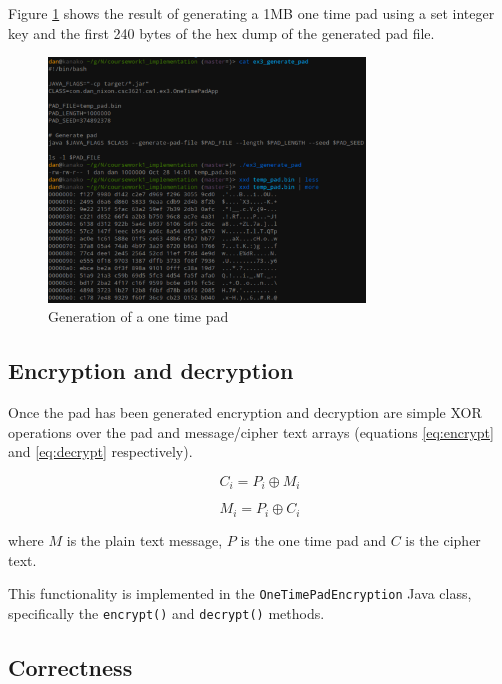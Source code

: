 \documentclass[a4paper]{article}
\begin{document}
Figure \ref{fig:generate_pad} shows the result of generating a 1MB one time pad
using a set integer key and the first 240 bytes of the hex dump of the generated
pad file.

\begin{figure}[h!]
  \centering
  \includegraphics[width=0.75\textwidth]{graphics/ex3_pad_generation.eps}
  \caption{Generation of a one time pad}
  \label{fig:generate_pad}
\end{figure}

\subsection{Encryption and decryption}

Once the pad has been generated encryption and decryption are simple XOR
operations over the pad and message/cipher text arrays (equations
\ref{eq:encrypt} and \ref{eq:decrypt} respectively).

\begin{equation}
  C_{i} = P_{i} \oplus M_{i}
  \label{eq:encrypt}
\end{equation}
\FloatBarrier

\begin{equation}
  M_{i} = P_{i} \oplus C_{i}
  \label{eq:decrypt}
\end{equation}
\FloatBarrier

where $M$ is the plain text message, $P$ is the one time pad and $C$ is the
cipher text.

This functionality is implemented in the \texttt{OneTimePadEncryption} Java
class, specifically the \texttt{encrypt()} and \texttt{decrypt()} methods.

\subsection{Correctness}
\end{document}
